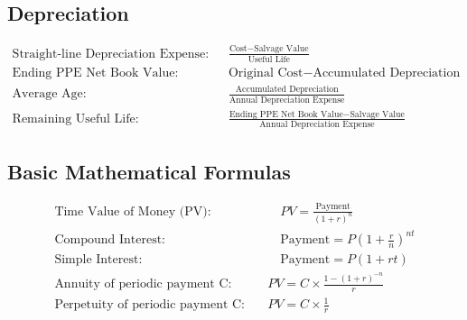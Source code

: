 \documentclass[12pt]{article}
\begin{document}
	\subsection{Depreciation}
\begin{tcolorbox}	
	\begin{align*}
		\text{Straight-line Depreciation Expense:} \quad & \frac{\text{Cost} - \text{Salvage Value}}{\text{Useful Life}} \\
		\text{Ending PPE Net Book Value:} \quad & \text{Original Cost} - \text{Accumulated Depreciation} \\
		\text{Average Age:} \quad & \frac{\text{Accumulated Depreciation}}{\text{Annual Depreciation Expense}} \\
		\text{Remaining Useful Life:} \quad & \frac{\text{Ending PPE Net Book Value} - \text{Salvage Value}}{\text{Annual Depreciation Expense}}
	\end{align*}
\end{tcolorbox}
	\subsection{Basic Mathematical Formulas}
\begin{tcolorbox}
	\begin{align*}
		\text{Time Value of Money (PV):} & \quad PV = \frac{\text{Payment}}{(1 + r)^n} \\
		\text{Compound Interest:} &  \quad \text{Payment} = P \left(1 + \frac{r}{n}\right)^{nt} \\
		\text{Simple Interest:} & \quad \text{Payment} = P  (1 + rt) \\
		\text{Annuity of periodic payment C:} \quad &  PV=C\times\frac{1-(1+r)^{-n}}{r} \\
		\text{Perpetuity  of periodic payment C:} \quad & PV=C\times\frac{1}{r} \\
	\end{align*}
\end{tcolorbox}
\end{document}
